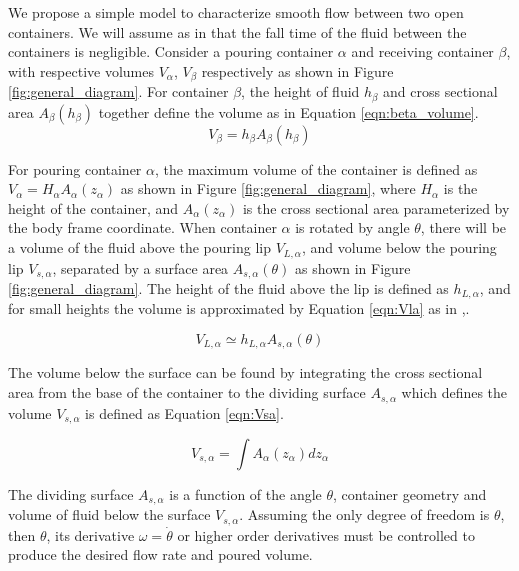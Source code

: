 We propose a simple model to characterize smooth flow between two open containers. We will assume as in \cite{sugimoto2002liquid} that the fall time of the fluid between the containers is negligible. Consider a pouring container $\alpha$ and receiving container $\beta$, with respective volumes $V_{\alpha}$, $V_{\beta}$ respectively as shown in Figure \ref{fig:general_diagram}. For container $\beta$, the height of fluid $h_{\beta}$ and cross sectional area $A_{\beta}(h_{\beta})$ together define the volume as in Equation \eqref{eqn:beta_volume}.  
\begin{equation}
V_{\beta}= h_{\beta} A_{\beta}(h_{\beta})
\label{eqn:beta_volume}
\end{equation}

For pouring container $\alpha$, the maximum volume of the container is defined as $V_{\alpha} = H_{\alpha} A_{\alpha}(z_{\alpha})$ as shown in Figure \ref{fig:general_diagram}, where $H_{\alpha}$ is the height of the container, and $A_{\alpha}(z_{\alpha})$ is the cross sectional area parameterized by the body frame coordinate. When container $\alpha$ is rotated by angle $\theta$, there will be a volume of the fluid above the pouring lip $V_{L,\alpha}$, and volume below the pouring lip $V_{s,\alpha}$, separated by a surface area $A_{s,\alpha}(\theta)$ as shown in Figure \ref{fig:general_diagram}. The height of the fluid above the lip is defined as $h_{L,\alpha}$, and for small heights the volume is approximated by Equation \eqref{eqn:Vla} as in \cite{tsuji2014high},\cite{noda2007falling}.

\begin{equation}
V_{L,\alpha} \simeq h_{L,\alpha} A_{s,\alpha}(\theta)
\label{eqn:Vla}
\end{equation}

The volume below the surface can be found by integrating the cross sectional area from the base of the container to the dividing surface $A_{s,\alpha}$ which defines the volume $V_{s,\alpha}$ is defined as Equation \eqref{eqn:Vsa}.

\begin{equation}
V_{s,\alpha} = \int A_{\alpha}(z_{\alpha}) dz_{\alpha}
\label{eqn:Vsa}
\end{equation}

The dividing surface $A_{s,\alpha}$ is a function of the angle $\theta$, container geometry and volume of fluid below the surface $V_{s,\alpha}$. Assuming the only degree of freedom is $\theta$, then $\theta$, its derivative $\omega = \dot{\theta}$ or higher order derivatives must be controlled to produce the desired flow rate and poured volume. 

